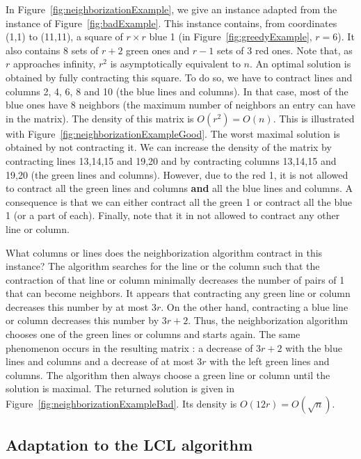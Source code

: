 In Figure~\ref{fig:neighborizationExample}, we give an instance adapted from the instance of Figure~\ref{fig:badExample}. This instance contains, from coordinates (1,1) to (11,11), a square of $r \times r$ blue 1 (in Figure~\ref{fig:greedyExample}, $r = 6$). It also contains $8$ sets of $r+2$ green ones and $r-1$ sets of $3$ red ones. Note that, as $r$ approaches infinity, $r^2$ is asymptotically equivalent to $n$. An optimal solution is obtained by fully contracting this square. To do so, we have to contract lines and columns 2, 4, 6, 8 and 10 (the blue lines and columns). In that case, most of the blue ones have 8 neighbors (the maximum number of neighbors an entry can have in the matrix). The density of this matrix is $O(r^2) = O(n)$. This is illustrated with Figure~\ref{fig:neighborizationExampleGood}. The worst maximal solution is obtained by not contracting it.  We can increase the density of the matrix by contracting lines 13,14,15 and 19,20 and by contracting columns 13,14,15 and 19,20 (the green lines and columns). However, due to the red 1, it is not allowed to contract all the green lines and columns \textbf{and} all the blue lines and columns. A consequence is that we can either contract all the green 1 or contract all the blue 1 (or a part of each). Finally, note that it in not allowed to contract any other line or column.

What columns or lines does the neighborization algorithm contract in this instance? The algorithm searches for the line or the column such that the contraction of that line or column minimally decreases the number of pairs of 1 that can become neighbors. It appears that contracting any green line or column decreases this number by at most $3r$. On the other hand, contracting a blue line or column decreases this number by $3r + 2$. Thus, the neighborization algorithm chooses one of the green lines or columns and starts again. The same phenomenon occurs in the resulting matrix : a decrease of $3r + 2$ with the blue lines and columns and a decrease of at most $3r$ with the left green lines and columns. The algorithm then always choose a green line or column until the solution is maximal. The returned solution is given in Figure~\ref{fig:neighborizationExampleBad}. Its density is $O(12r) = O(\sqrt{n})$. 


\renewcommand{\gridsize}{0.5}




\subsection{Adaptation to the LCL algorithm}
\renewcommand{\gridsize}{0.35}

